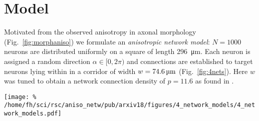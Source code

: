 
\section*{Model}
\vspace{-0.2cm}

Motivated from the observed anisotropy in axonal morphology (Fig.~\ref{fig:morphaniso}) we formulate an \textit{anisotropic network model}: $N=1000$ neurons are distributed uniformly on a square of length \SI{296}{\micro\meter}. Each neuron is assigned a random direction $\alpha \in [0,2\pi)$ and connections are established to target neurons lying within in a corridor of width $w=\text{\SI{74.6}{\micro\meter}}$ (Fig.~\ref{fig:4nets}). Here $w$ was tuned to obtain a network connection density of $p=11.6$ as found in \cite{Song2005}.

\begin{center}\vspace{0.01cm}
  \texttt{[image: \%
    /home/fh/sci/rsc/aniso\_netw/pub/arxiv18/figures/4\_network\_models/4\_network\_models.pdf]}
  \label{fig:4nets}
\end{center}\vspace{2cm}




